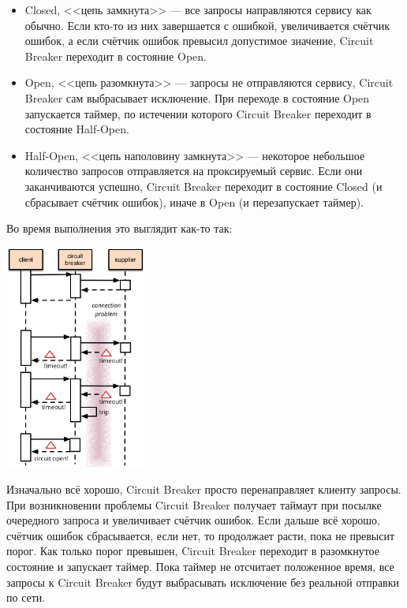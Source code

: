 \documentclass{../../text-style}
\begin{document}
\begin{itemize}
    \item Closed, <<цепь замкнута>> --- все запросы направляются сервису как обычно. Если кто-то из них завершается с ошибкой, увеличивается счётчик ошибок, а если счётчик ошибок превысил допустимое значение, Circuit Breaker переходит в состояние Open.
    \item Open, <<цепь разомкнута>> --- запросы не отправляются сервису, Circuit Breaker сам выбрасывает исключение. При переходе в состояние Open запускается таймер, по истечении которого Circuit Breaker переходит в состояние Half-Open.
    \item Half-Open, <<цепь наполовину замкнута>> --- некоторое небольшое количество запросов отправляется на проксируемый сервис. Если они заканчиваются успешно, Circuit Breaker переходит в состояние Closed (и сбрасывает счётчик ошибок), иначе в Open (и перезапускает таймер).
\end{itemize}

Во время выполнения это выглядит как-то так:

\begin{center}
    \includegraphics[width=0.35\textwidth]{circuitBreakerSequence.png}
\end{center}

Изначально всё хорошо, Circuit Breaker просто перенаправляет клиенту запросы. При возникновении проблемы Circuit Breaker получает таймаут при посылке очередного запроса и увеличивает счётчик ошибок. Если дальше всё хорошо, счётчик ошибок сбрасывается, если нет, то продолжает расти, пока не превысит порог. Как только порог превышен, Circuit Breaker переходит в разомкнутое состояние и запускает таймер. Пока таймер не отсчитает положенное время, все запросы к Circuit Breaker будут выбрасывать исключение без реальной отправки по сети.
\end{document}
